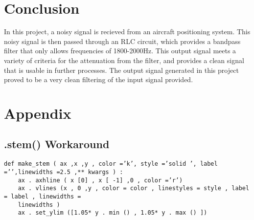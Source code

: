 \documentclass[12pt]{report}
\begin{document}
\section{Conclusion}
In this project, a noisy signal is recieved from an aircraft positioning system. This noisy signal is then passed through an RLC circuit, which provides a bandpass filter that only allows frequencies of 1800-2000Hz. This output signal meets a variety of criteria for the attenuation from the filter, and provides a clean signal that is usable in further processes. The output signal generated in this project proved to be a very clean filtering of the input signal provided. 

\section{Appendix}
\subsection{.stem() Workaround}
\begin{verbatim}
def make_stem ( ax ,x ,y , color =’k’, style =’solid ’, label =’’,linewidths =2.5 ,** kwargs ) :
    ax . axhline ( x [0] , x [ -1] ,0 , color =’r’)
    ax . vlines (x , 0 ,y , color = color , linestyles = style , label = label , linewidths =
    linewidths )
    ax . set_ylim ([1.05* y . min () , 1.05* y . max () ])

\end{verbatim}
\end{document}

